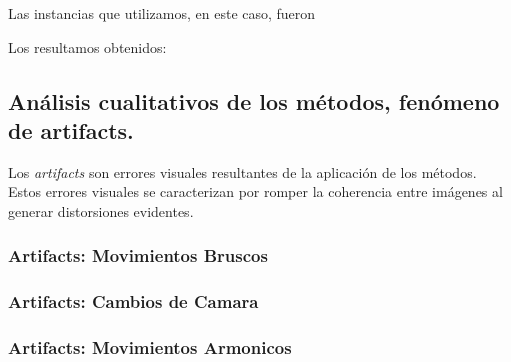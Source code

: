 Las instancias que utilizamos, en este caso, fueron

Los resultamos obtenidos:


\subsection{Análisis cualitativos de los métodos, fenómeno de artifacts.}
Los \textit{artifacts} son errores visuales resultantes de la aplicación de los métodos. Estos errores visuales se caracterizan por romper la coherencia entre imágenes al generar distorsiones evidentes.

\subsubsection{Artifacts: Movimientos Bruscos}

\subsubsection{Artifacts: Cambios de Camara}

\subsubsection{Artifacts: Movimientos Armonicos}
